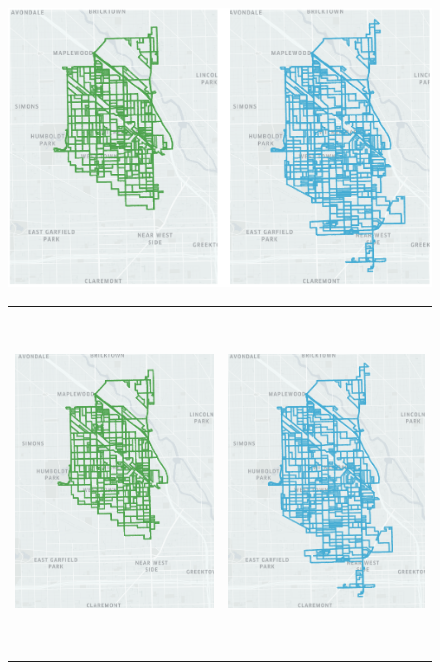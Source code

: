 \begin{figure}[t]
  \begin{center}
  \iflatexml
  \includegraphics[width=6\textwidth]{figs/il_rl_all.png}
  \else
    \begin{tabular}{ll}
      \includegraphics[height=9.1cm,trim={0.2cm 0 0.4cm 0},clip]{figs/il_rl_rl.png} &
      \includegraphics[height=9.1cm,trim={0.2cm 0 0.8cm 0},clip]{figs/il_rl_il.png} \\

\end{tabular}
\end{center}
\end{figure}
